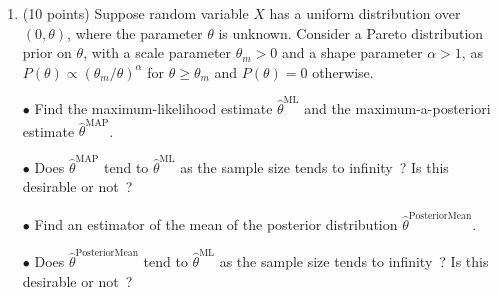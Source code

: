 \documentclass[11pt]{article}
\begin{document}
\begin {enumerate}
  $\bullet$ Where is the mode of this Gaussian situated within $\mathbb{R}^2$~? Do you think this Gaussian fits the data well~? Is it a good model~?
  Why or why not~?
  
  $\bullet$ Generate a large sample that is uniformly distributed on a circle with center origin and radius $r$. Compute the maximum likelihood
  estimates for the mean and covariance and report them, along with the sample size. Do they match the theoretically predicted values~?
  
\item %
  
  (10 points) Suppose random variable $X$ has a uniform distribution over $(0, \theta)$, where the parameter $\theta$ is unknown. Consider a Pareto
  distribution prior on $\theta$, with a scale parameter $\theta_m > 0$ and a shape parameter $\alpha > 1$, as $P (\theta) \propto (\theta_m /
  \theta)^{\alpha}$ for $\theta \ge \theta_m$ and $P (\theta) = 0$ otherwise.
  
  $\bullet$ Find the maximum-likelihood estimate $\widehat \theta^{\text{ML}}$ and the maximum-a-posteriori estimate $\widehat \theta^{\text{MAP}}$.
  
  $\bullet$ Does $\widehat \theta^{\text{MAP}}$ tend to $\widehat \theta^{\text{ML}}$ as the sample size tends to infinity~? Is this desirable or
  not~?
  
  $\bullet$ Find an estimator of the mean of the posterior distribution $\widehat \theta^{\text{PosteriorMean}}$.
  
  $\bullet$ Does $\widehat \theta^{\text{PosteriorMean}}$ tend to $\widehat \theta^{\text{ML}}$ as the sample size tends to infinity~? Is this
  desirable or not~?
  
\end {enumerate}
\end{document}
